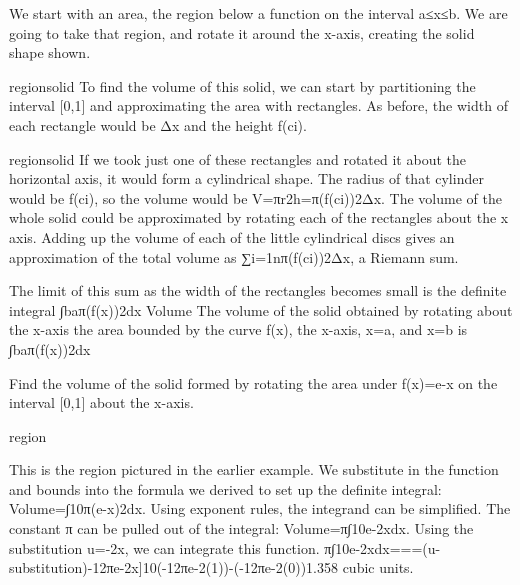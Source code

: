 We start with an area, the region below a function on the interval a≤x≤b. We are going to take that region, and rotate it around the x-axis, creating the solid shape shown.

regionsolid
To find the volume of this solid, we can start by partitioning the interval [0,1] and approximating the area with rectangles. As before, the width of each rectangle would be Δx and the height f(ci).

regionsolid
If we took just one of these rectangles and rotated it about the horizontal axis, it would form a cylindrical shape. The radius of that cylinder would be f(ci), so the volume would be
V=πr2h=π(f(ci))2Δx.
The volume of the whole solid could be approximated by rotating each of the rectangles about the x axis. Adding up the volume of each of the little cylindrical discs gives an approximation of the total volume as ∑i=1nπ(f(ci))2Δx, a Riemann sum.

The limit of this sum as the width of the rectangles becomes small is the definite integral ∫baπ(f(x))2dx
Volume
The volume of the solid obtained by rotating about the x-axis the area bounded by the curve f(x), the x-axis, x=a, and x=b is
∫baπ(f(x))2dx
\begin{example}
Find the volume of the solid formed by rotating the area under f(x)=e-x on the interval [0,1] about the x-axis.

region
\begin{solution}
This is the region pictured in the earlier example. We substitute in the function and bounds into the formula we derived to set up the definite integral:
Volume=∫10π(e-x)2dx.
Using exponent rules, the integrand can be simplified. The constant π can be pulled out of the integral:
Volume=π∫10e-2xdx.
Using the substitution u=-2x, we can integrate this function.
π∫10e-2xdx===\approx   (u-substitution)-12πe-2x]10(-12πe-2(1))-(-12πe-2(0))1.358 cubic units.
\end{solution}\end{example}
